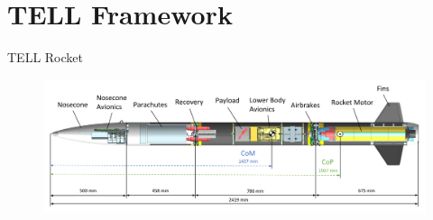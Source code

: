 \documentclass[12pt, compress, xcolor=table]{beamer}
\begin{document}
\section{TELL Framework}

\begin{frame}{TELL Rocket}
 \begin{figure}
  \includegraphics[width=\textwidth]{images/TELL_Structure.png}
 \end{figure}
\end{frame}
\end{document}
